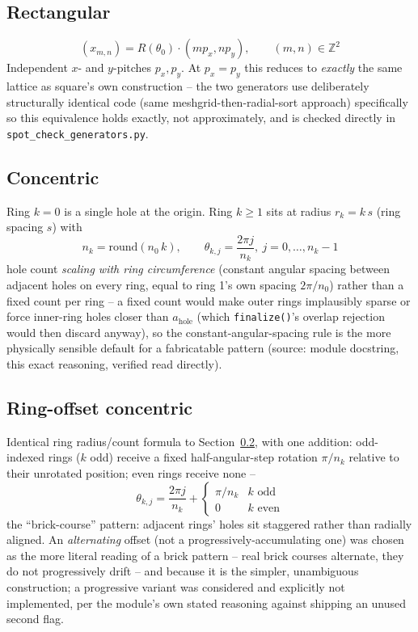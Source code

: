 \subsection{Rectangular}
\begin{equation}
(x_{m,n}) = R(\theta_0)\cdot(mp_x, np_y), \qquad (m,n)\in\mathbb{Z}^2
\end{equation}
Independent $x$- and $y$-pitches $p_x,p_y$. At $p_x=p_y$ this reduces to \emph{exactly}
the same lattice as square's own construction -- the two generators use deliberately
structurally identical code (same meshgrid-then-radial-sort approach) specifically so
this equivalence holds exactly, not approximately, and is checked directly in
\texttt{spot\_check\_generators.py}.

\subsection{Concentric}
\label{sec:concentric-family}
Ring $k=0$ is a single hole at the origin. Ring $k\ge1$ sits at radius $r_k=k\,s$ (ring
spacing $s$) with
\begin{equation}
n_k = \mathrm{round}(n_0\,k), \qquad
\theta_{k,j} = \frac{2\pi j}{n_k},\ j=0,\dots,n_k-1
\end{equation}
hole count \emph{scaling with ring circumference} (constant angular spacing between
adjacent holes on every ring, equal to ring 1's own spacing $2\pi/n_0$) rather than a
fixed count per ring -- a fixed count would make outer rings implausibly sparse or
force inner-ring holes closer than $a_{\mathrm{hole}}$ (which \texttt{finalize()}'s
overlap rejection would then discard anyway), so the constant-angular-spacing rule is
the more physically sensible default for a fabricatable pattern (source: module
docstring, this exact reasoning, verified read directly).

\subsection{Ring-offset concentric}
\label{sec:ring-offset-family}
Identical ring radius/count formula to Section~\ref{sec:concentric-family}, with one
addition: odd-indexed rings ($k$ odd) receive a fixed half-angular-step rotation
$\pi/n_k$ relative to their unrotated position; even rings receive none --
\begin{equation}
\theta_{k,j} = \frac{2\pi j}{n_k} + \begin{cases}\pi/n_k & k\text{ odd}\\0&k\text{ even}\end{cases}
\end{equation}
the ``brick-course'' pattern: adjacent rings' holes sit staggered rather than radially
aligned. An \emph{alternating} offset (not a progressively-accumulating one) was
chosen as the more literal reading of a brick pattern -- real brick courses alternate,
they do not progressively drift -- and because it is the simpler, unambiguous
construction; a progressive variant was considered and explicitly not implemented,
per the module's own stated reasoning against shipping an unused second flag.


